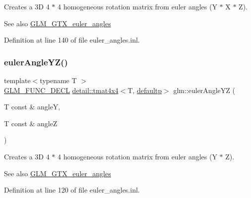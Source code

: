 Creates a 3D 4 $\ast$ 4 homogeneous rotation matrix from euler angles (Y $\ast$ X $\ast$ Z). \begin{DoxySeeAlso}{See also}
\hyperlink{group__gtx__euler__angles}{G\+L\+M\+\_\+\+G\+T\+X\+\_\+euler\+\_\+angles} 
\end{DoxySeeAlso}


Definition at line 140 of file euler\+\_\+angles.\+inl.

\mbox{\label{group__gtx__euler__angles_ga4bff0f8324770261d3a6ddadd790ec22}} 
\subsubsection{\texorpdfstring{euler\+Angle\+Y\+Z()}{eulerAngleYZ()}}
{\footnotesize\ttfamily template$<$typename T $>$ \\
\hyperlink{setup_8hpp_ab2d052de21a70539923e9bcbf6e83a51}{G\+L\+M\+\_\+\+F\+U\+N\+C\+\_\+\+D\+E\+CL} \hyperlink{structglm_1_1detail_1_1tmat4x4}{detail\+::tmat4x4}$<$T, \hyperlink{namespaceglm_a0f04f086094c747d227af4425893f545a9d21ccd8b5a009ec7eb7677befc3bf51}{defaultp}$>$ glm\+::euler\+Angle\+YZ (\begin{DoxyParamCaption}\item[{T const \&}]{angleY,  }\item[{T const \&}]{angleZ }\end{DoxyParamCaption})}

Creates a 3D 4 $\ast$ 4 homogeneous rotation matrix from euler angles (Y $\ast$ Z). \begin{DoxySeeAlso}{See also}
\hyperlink{group__gtx__euler__angles}{G\+L\+M\+\_\+\+G\+T\+X\+\_\+euler\+\_\+angles} 
\end{DoxySeeAlso}


Definition at line 120 of file euler\+\_\+angles.\+inl.

\mbox{\label{group__gtx__euler__angles_gaf55b28c29ebd7ba728f1ad6490c89687}} 
